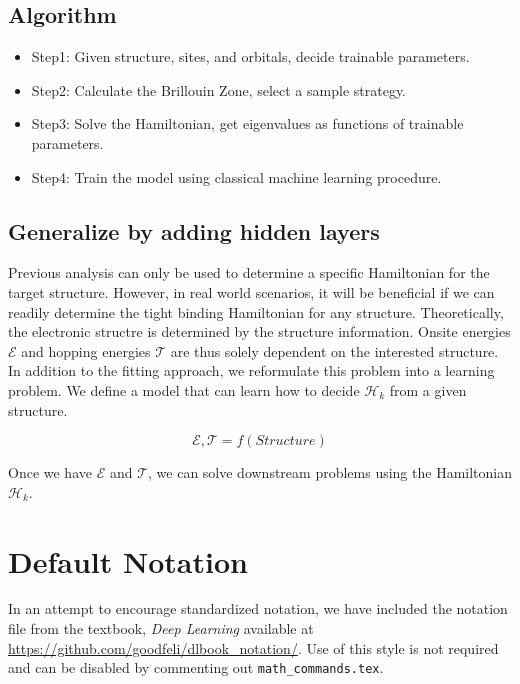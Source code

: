 \documentclass{article} %
\begin{document}
\subsection{Algorithm}

\begin{itemize}
\item Step1: Given structure, sites, and orbitals, decide trainable parameters.
\item Step2: Calculate the Brillouin Zone, select a sample strategy.
\item Step3: Solve the Hamiltonian, get eigenvalues as functions of trainable parameters. 
\item Step4: Train the model using classical machine learning procedure.
\end{itemize}

\subsection{Generalize by adding hidden layers}

Previous analysis can only be used to determine a specific Hamiltonian for the target structure. However,
in real world scenarios, it will be beneficial if we can readily determine the tight binding Hamiltonian
for any structure. Theoretically, the electronic structre is determined by the structure information. Onsite
energies $\mathcal{E}$ and hopping energies $\mathcal{T}$ are thus solely dependent on the interested
structure. In addition to the fitting approach, we reformulate this problem into a learning problem. We define
a model that can learn how to decide $\mathcal{H}_k$ from a given structure.

\begin{equation}
\mathcal{E}, \mathcal{T} = f(Structure)
\end{equation}

Once we have $\mathcal{E}$ and $\mathcal{T}$, we can solve downstream problems using the Hamiltonian
$\mathcal{H}_k$.

\section{Default Notation}

In an attempt to encourage standardized notation, we have included the
notation file from the textbook, \textit{Deep Learning}
\cite{goodfellow2016deep} available at
\url{https://github.com/goodfeli/dlbook_notation/}.  Use of this style
is not required and can be disabled by commenting out
\texttt{math\_commands.tex}.
\end{document}
